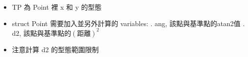 \begin{itemize}[leftmargin=2em, listparindent=-2em]
    \item TP 為 Point 裡 x 和 y 的型態
    \item struct Point 需要加入並另外計算的 variables:
        . ang, 該點與基準點的atan2值
        . d2, 該點與基準點的$(距離)^2$
    \item 注意計算 d2 的型態範圍限制 
\end{itemize}